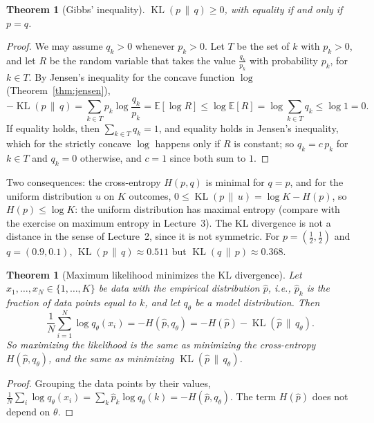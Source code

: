 \documentclass[11pt]{article}
\newcommand{\E}{\mathbb{E}}
\DeclareMathOperator{\KL}{KL}
\theoremstyle{definition}
\theoremstyle{plain}
\newtheorem{theorem}[definition]{Theorem}
\theoremstyle{remark}
\begin{document}
\begin{theorem}[Gibbs' inequality]\label{thm:gibbs}
    $\KL(p \,\|\, q) \geq 0$, with equality if and only if $p = q$.
\end{theorem}

\begin{proof}
    We may assume $q_k > 0$ whenever $p_k > 0$. Let $T$ be the set of $k$ with $p_k > 0$, and let $R$ be the random variable that takes the value $\frac{q_k}{p_k}$ with probability $p_k$, for $k \in T$. By Jensen's inequality for the concave function $\log$ (Theorem~\ref{thm:jensen}),
    \[-\KL(p \,\|\, q) = \sum_{k \in T} p_k\log\frac{q_k}{p_k} = \E[\log R] \leq \log\E[R] = \log\sum_{k \in T} q_k \leq \log 1 = 0.\]
    If equality holds, then $\sum_{k \in T} q_k = 1$, and equality holds in Jensen's inequality, which for the strictly concave $\log$ happens only if $R$ is constant; so $q_k = c\,p_k$ for $k \in T$ and $q_k = 0$ otherwise, and $c = 1$ since both sum to $1$.
\end{proof}

Two consequences: the cross-entropy $H(p, q)$ is minimal for $q = p$, and for the uniform distribution $u$ on $K$ outcomes, $0 \leq \KL(p \,\|\, u) = \log K - H(p)$, so $H(p) \leq \log K$: the uniform distribution has maximal entropy (compare with the exercise on maximum entropy in Lecture~3). The KL divergence is not a distance in the sense of Lecture~2, since it is not symmetric. For $p = (\frac{1}{2}, \frac{1}{2})$ and $q = (0.9, 0.1)$, $\KL(p \,\|\, q) \approx 0.511$ but $\KL(q \,\|\, p) \approx 0.368$.

\begin{theorem}[Maximum likelihood minimizes the KL divergence]\label{thm:mle-kl}
    Let $x_1, \ldots, x_N \in \{1, \ldots, K\}$ be data with the empirical distribution $\hat p$, i.e., $\hat p_k$ is the fraction of data points equal to $k$, and let $q_\theta$ be a model distribution. Then
    \[\frac{1}{N}\sum_{i=1}^N \log q_\theta(x_i) = -H(\hat p, q_\theta) = -H(\hat p) - \KL(\hat p \,\|\, q_\theta).\]
    So maximizing the likelihood is the same as minimizing the cross-entropy $H(\hat p, q_\theta)$, and the same as minimizing $\KL(\hat p \,\|\, q_\theta)$.
\end{theorem}

\begin{proof}
    Grouping the data points by their values, $\frac{1}{N}\sum_i \log q_\theta(x_i) = \sum_k \hat p_k\log q_\theta(k) = -H(\hat p, q_\theta)$. The term $H(\hat p)$ does not depend on $\theta$.
\end{proof}
\end{document}
